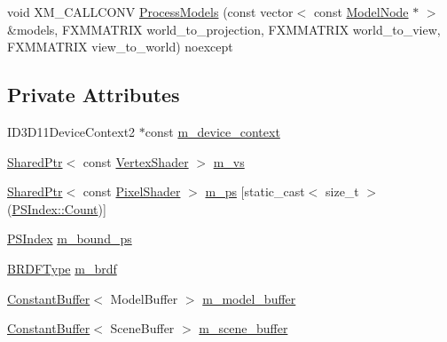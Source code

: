 \begin{DoxyCompactItemize}
\item 
void X\+M\+\_\+\+C\+A\+L\+L\+C\+O\+NV \hyperlink{classmage_1_1_variable_shading_pass_ac9cbbb4817fed29751b2b1a4549bebda}{Process\+Models} (const vector$<$ const \hyperlink{classmage_1_1_model_node}{Model\+Node} $\ast$ $>$ \&models, F\+X\+M\+M\+A\+T\+R\+IX world\+\_\+to\+\_\+projection, F\+X\+M\+M\+A\+T\+R\+IX world\+\_\+to\+\_\+view, F\+X\+M\+M\+A\+T\+R\+IX view\+\_\+to\+\_\+world) noexcept
\end{DoxyCompactItemize}
\subsection*{Private Attributes}
\begin{DoxyCompactItemize}
\item 
I\+D3\+D11\+Device\+Context2 $\ast$const \hyperlink{classmage_1_1_variable_shading_pass_afff786ea38b64ba069866fdd6b525ba7}{m\+\_\+device\+\_\+context}
\item 
\hyperlink{namespacemage_a1e01ae66713838a7a67d30e44c67703e}{Shared\+Ptr}$<$ const \hyperlink{classmage_1_1_vertex_shader}{Vertex\+Shader} $>$ \hyperlink{classmage_1_1_variable_shading_pass_af052be9aac0bea955b881eca06e74c24}{m\+\_\+vs}
\item 
\hyperlink{namespacemage_a1e01ae66713838a7a67d30e44c67703e}{Shared\+Ptr}$<$ const \hyperlink{namespacemage_ac98506b7edd999ea43ec46fbd0330238}{Pixel\+Shader} $>$ \hyperlink{classmage_1_1_variable_shading_pass_aacd5b6b967a0fcfe7510e289c3d630a0}{m\+\_\+ps} \mbox{[}static\+\_\+cast$<$ size\+\_\+t $>$(\hyperlink{classmage_1_1_variable_shading_pass_a49519e421ac5be93136d9efdbf075d4aae93f994f01c537c4e2f7d8528c3eb5e9}{P\+S\+Index\+::\+Count})\mbox{]}
\item 
\hyperlink{classmage_1_1_variable_shading_pass_a49519e421ac5be93136d9efdbf075d4a}{P\+S\+Index} \hyperlink{classmage_1_1_variable_shading_pass_acb1d0d78a9de9afc2d668d87134c5ec5}{m\+\_\+bound\+\_\+ps}
\item 
\hyperlink{namespacemage_ae7a7a03a7b34d7e2689689bb8295cd38}{B\+R\+D\+F\+Type} \hyperlink{classmage_1_1_variable_shading_pass_ac6147f2068fd7727fe2d78584ff68767}{m\+\_\+brdf}
\item 
\hyperlink{structmage_1_1_constant_buffer}{Constant\+Buffer}$<$ Model\+Buffer $>$ \hyperlink{classmage_1_1_variable_shading_pass_ab83602f0ffa6c0a3519ffaa467ae113a}{m\+\_\+model\+\_\+buffer}
\item 
\hyperlink{structmage_1_1_constant_buffer}{Constant\+Buffer}$<$ Scene\+Buffer $>$ \hyperlink{classmage_1_1_variable_shading_pass_ae55088f911acc5f2f997a5ff6bcf333c}{m\+\_\+scene\+\_\+buffer}

\end{DoxyCompactItemize}
